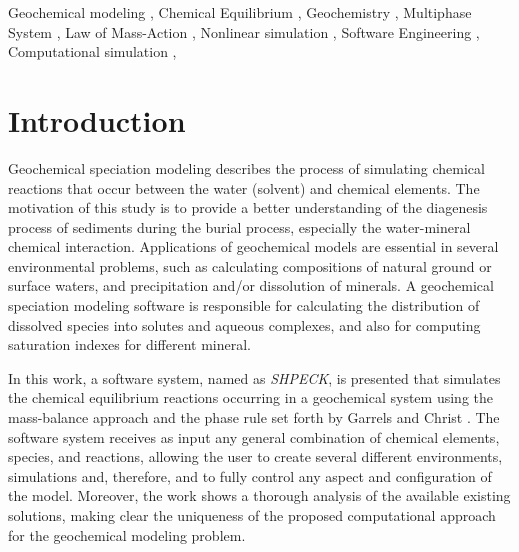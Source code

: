 \documentclass[preprint,12pt,3p]{elsarticle}
\begin{document}
\begin{frontmatter}
\begin{keyword}
Geochemical modeling \sep
Chemical Equilibrium \sep
Geochemistry \sep 
Multiphase System \sep
Law of Mass-Action \sep
Nonlinear simulation \sep
Software Engineering \sep
Computational simulation \sep

\end{keyword}

\end{frontmatter}


\section{Introduction}
Geochemical speciation modeling describes the process of simulating chemical reactions that occur between the water (solvent) and chemical elements. The motivation of this study is to provide a better understanding of the diagenesis process of sediments during the burial process, especially the water-mineral chemical interaction. Applications of geochemical models are essential in several environmental problems, such as calculating compositions of natural ground or surface waters, and precipitation and/or dissolution of minerals. A geochemical speciation modeling software is responsible for calculating the distribution of dissolved species into solutes and aqueous complexes, and also for computing saturation indexes for different mineral. 

In this work, a software system, named as \emph{SHPECK}, is presented that simulates the chemical equilibrium reactions occurring in a geochemical system using the mass-balance approach and the phase rule set forth by Garrels and Christ \cite{Garrels:65}. The software system receives as input any general combination of chemical elements, species, and reactions, allowing the user to create several different environments, simulations and, therefore, and to fully control any aspect and configuration of the model. Moreover, the work shows a thorough analysis of the available existing solutions, making clear the uniqueness of the proposed computational approach for the geochemical modeling problem.
\end{document}
